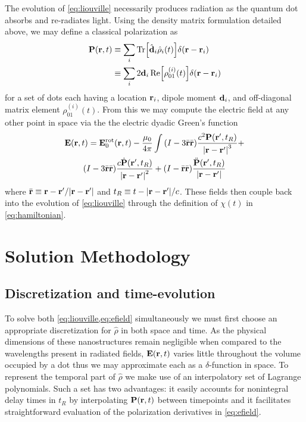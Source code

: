 \documentclass[conference]{IEEEtran}
\begin{document}
The evolution of \cref{eq:liouville} necessarily produces radiation as the quantum dot absorbs and re-radiates light.
Using the density matrix formulation detailed above, we may define a classical polarization as
\begin{equation}
  \begin{aligned}
    \vb{P}(\vb{r}, t) &\equiv \sum_i \Tr[\hat{\vb{d}}_i \hat{\rho}_i(t)] \delta(\vb{r} - \vb{r}_i) \\
                      &\equiv \sum_i 2 \vb{d}_i \Re\!\qty[\rho_{01}^{(i)}(t)] \delta(\vb{r} - \vb{r}_i)
  \end{aligned}
  \label{eq:polarization}
\end{equation}
for a set of dots each having a location $\vb{r}_i$, dipole moment $\vb{d}_i$, and off-diagonal matrix element $\rho_{01}^{(i)}(t)$.
From this we may compute the electric field at any other point in space via the the electric dyadic Green's function\cite{Rothwell2008}
\begin{equation}
  \begin{gathered}
    \vb{E}(\vb{r}, t) = \vb{E}_0^\text{rot}(\vb{r}, t) - \frac{\mu_0}{4\pi} \int
      \qty(I - 3\bar{\vb{r}}\bar{\vb{r}}) \frac{c^2 \vb{P}(\vb{r}', t_R)}{\abs{\vb{r} - \vb{r}'}^3} + \\
      \qty(I - 3\bar{\vb{r}}\bar{\vb{r}}) \frac{c \dot{\vb{P}}(\vb{r}', t_R)}{\abs{\vb{r} - \vb{r}'}^2} +
      \qty(I -  \bar{\vb{r}}\bar{\vb{r}}) \frac{\ddot{\vb{P}}(\vb{r}', t_R)}{\abs{\vb{r} - \vb{r}'}}
  \end{gathered}
  \label{eq:efield}
\end{equation}
where $\bar{\vb{r}} \equiv \vb{r} - \vb{r}'/\abs{\vb{r} - \vb{r}'}$ and $t_R \equiv t - \abs{\vb{r} - \vb{r}'}/c$.
These fields then couple back into the evolution of \cref{eq:liouville} through the definition of $\chi(t)$ in \cref{eq:hamiltonian}.

\section{Solution Methodology}
\subsection{Discretization and time-evolution}

To solve both \cref{eq:liouville,eq:efield} simultaneously we must first choose an appropriate discretization for $\hat{\rho}$ in both space and time.
As the physical dimensions of these nanostructures remain negligible when compared to the wavelengths present in radiated fields, $\vb{E}(\vb{r}, t)$ varies little throughout the volume occupied by a dot thus we may approximate each as a $\delta$-function in space.
To represent the temporal part of $\hat{\rho}$ we make use of an interpolatory set of Lagrange polynomials.
Such a set has two advantages: it easily accounts for nonintegral delay times in $t_R$ by interpolating $\vb{P}(\vb{r}, t)$ between timepoints and it facilitates straightforward evaluation of the polarization derivatives in \cref{eq:efield}.
\end{document}
